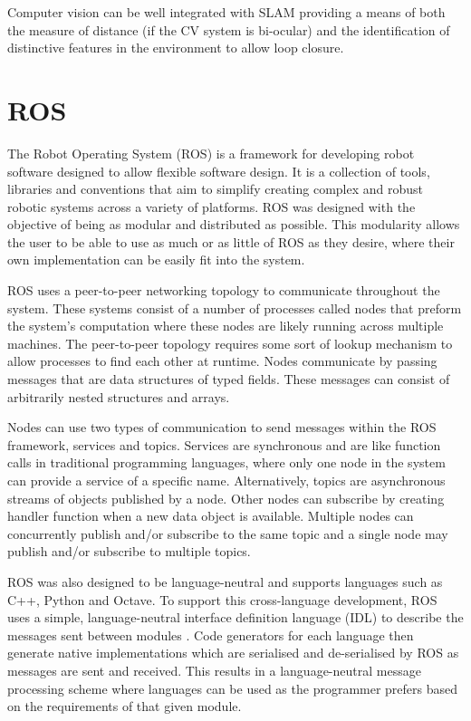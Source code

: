 Computer vision can be well integrated with SLAM providing a means of both the measure
of distance (if the CV system is bi-ocular) and the identification of distinctive
features in the environment to allow loop closure\cite{CVho2006loop}.

\section{ROS}\label{litreview/ROS}
The Robot Operating System (ROS) is a framework for developing robot
software designed to allow flexible software design. It is a collection of tools, 
libraries and conventions that aim to simplify creating complex and 
robust robotic systems across a variety of platforms.\cite{aboutROS}
ROS was designed with the objective of being as modular and distributed
as possible. This modularity allows the user to be able to use as much or
as little of ROS as they desire, where their own implementation can be
easily fit into the system. \cite{rosForMe}

ROS uses a peer-to-peer networking topology to communicate throughout 
the system. These systems consist of a number of processes called nodes 
that preform the system's computation where these nodes are likely 
running across multiple machines. The peer-to-peer  topology requires 
some sort of lookup mechanism to allow processes to find each other at 
runtime. Nodes communicate by passing messages that are data structures 
of typed fields. These messages can consist of arbitrarily nested 
structures and arrays. \cite{crick2017rosbridge}

Nodes can use two types of communication to send messages within the ROS 
framework, services and topics. Services are synchronous and are like function
calls in traditional programming languages, where only one node in the 
system can provide a service of a specific name. Alternatively, topics are
asynchronous streams of objects published by a node. Other nodes can 
subscribe by creating  handler function when a new data object is available.
Multiple nodes can concurrently publish and/or subscribe to the same topic and
a single node may publish and/or subscribe to multiple topics.

ROS was also designed to be language-neutral and supports languages 
such as C++, Python and Octave. To support this cross-language 
development, ROS uses a simple, language-neutral interface definition 
language (IDL) to describe the messages sent between modules 
\cite{quigley2009ros}. Code generators for each language then generate 
native implementations which are serialised and de-serialised by ROS 
as messages are sent and received. This results in a language-neutral 
message processing scheme where languages can be used as the programmer 
prefers based on the requirements of that given module. 

